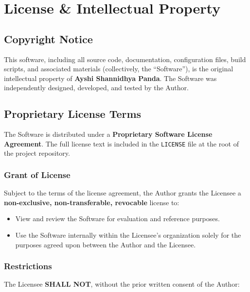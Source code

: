\documentclass[12pt,a4paper]{report}
\begin{document}
\chapter{License \& Intellectual Property}

\section{Copyright Notice}
\begin{center}
\end{center}

\vspace{0.5cm}

This software, including all source code, documentation, configuration files, build scripts, and associated materials (collectively, the ``Software''), is the original intellectual property of \textbf{Ayshi Shannidhya Panda}. The Software was independently designed, developed, and tested by the Author.

\section{Proprietary License Terms}

The Software is distributed under a \textbf{Proprietary Software License Agreement}. The full license text is included in the \texttt{LICENSE} file at the root of the project repository.

\subsection{Grant of License}
Subject to the terms of the license agreement, the Author grants the Licensee a \textbf{non-exclusive, non-transferable, revocable} license to:
\begin{itemize}[leftmargin=*]
    \item View and review the Software for evaluation and reference purposes.
    \item Use the Software internally within the Licensee's organization solely for the purposes agreed upon between the Author and the Licensee.
\end{itemize}

\subsection{Restrictions}
The Licensee \textbf{SHALL NOT}, without the prior written consent of the Author:
\end{document}
